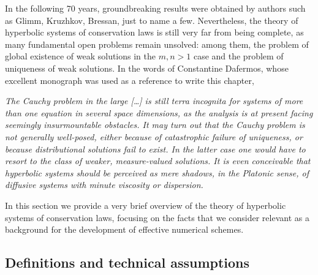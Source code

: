 In the following 70 years, groundbreaking results were obtained
by authors such as Glimm, Kruzhkov, Bressan, just to name a few.
Nevertheless, the theory of hyperbolic systems of conservation laws is still
very far from being complete, as many fundamental open problems remain
unsolved: among them, the problem of global existence of weak
solutions in the $m,n > 1$ case and the problem of uniqueness of weak solutions.
In the words of Constantine Dafermos, whose excellent monograph \cite{dafermos}
was used as a reference to write this chapter,
\begin{displayquote}
\textit{The Cauchy problem in the large [\dots]
is still terra incognita for systems of more
than one equation in several space dimensions, as the analysis is at
present facing seemingly insurmountable obstacles. It may turn out that
the Cauchy problem is not generally well-posed, either because of
catastrophic failure of uniqueness, or because distributional solutions
fail to exist. In the latter case one would have to resort to the class
of weaker, measure-valued solutions. It is even conceivable that
hyperbolic systems should be perceived as mere shadows, in the Platonic sense,
of diffusive systems with minute viscosity or dispersion.}
\end{displayquote}
In this section we provide a very brief overview of the theory of hyperbolic
systems of conservation laws, focusing on the facts that
we consider relevant as a background for the development
of effective numerical schemes.

\subsection*{Definitions and technical assumptions}

